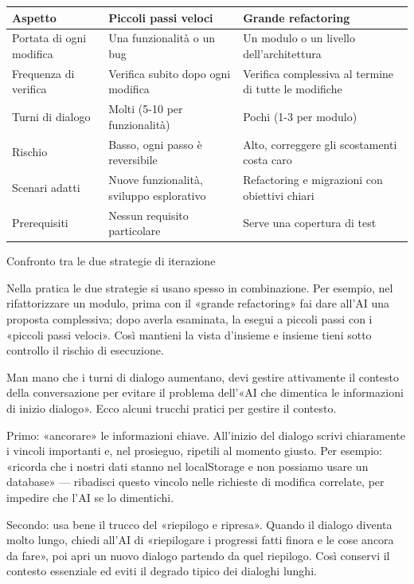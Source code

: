 \begin{center}
\begin{tabularx}{\linewidth}{|X|X|X|}
\hline
\textbf{Aspetto} & \textbf{Piccoli passi veloci} & \textbf{Grande refactoring} \tabularnewline
\hline
Portata di ogni modifica & Una funzionalità o un bug & Un modulo o un livello dell'architettura \tabularnewline
Frequenza di verifica & Verifica subito dopo ogni modifica & Verifica complessiva al termine di tutte le modifiche \tabularnewline
Turni di dialogo & Molti (5-10 per funzionalità) & Pochi (1-3 per modulo) \tabularnewline
Rischio & Basso, ogni passo è reversibile & Alto, correggere gli scostamenti costa caro \tabularnewline
Scenari adatti & Nuove funzionalità, sviluppo esplorativo & Refactoring e migrazioni con obiettivi chiari \tabularnewline
Prerequisiti & Nessun requisito particolare & Serve una copertura di test \tabularnewline
\hline
\end{tabularx}
\end{center}

\begin{center}\small\color{gray}Confronto tra le due strategie di iterazione\end{center}

Nella pratica le due strategie si usano spesso in combinazione. Per esempio, nel rifattorizzare un modulo, prima con il «grande refactoring» fai dare all'AI una proposta complessiva; dopo averla esaminata, la esegui a piccoli passi con i «piccoli passi veloci». Così mantieni la vista d'insieme e insieme tieni sotto controllo il rischio di esecuzione.


Man mano che i turni di dialogo aumentano, devi gestire attivamente il contesto della conversazione per evitare il problema dell'«AI che dimentica le informazioni di inizio dialogo». Ecco alcuni trucchi pratici per gestire il contesto.

Primo: «ancorare» le informazioni chiave. All'inizio del dialogo scrivi chiaramente i vincoli importanti e, nel prosieguo, ripetili al momento giusto. Per esempio: «ricorda che i nostri dati stanno nel localStorage e non possiamo usare un database» — ribadisci questo vincolo nelle richieste di modifica correlate, per impedire che l'AI se lo dimentichi.

Secondo: usa bene il trucco del «riepilogo e ripresa». Quando il dialogo diventa molto lungo, chiedi all'AI di «riepilogare i progressi fatti finora e le cose ancora da fare», poi apri un nuovo dialogo partendo da quel riepilogo. Così conservi il contesto essenziale ed eviti il degrado tipico dei dialoghi lunghi.


